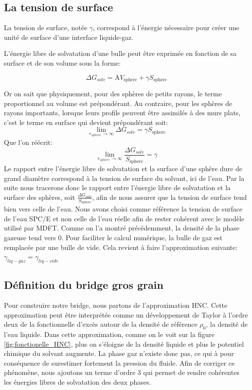 \subsection{La tension de surface}
La tension de surface, notée $\gamma$, correspond à l'énergie nécessaire pour créer une unité de surface d'une interface liquide-gaz.

L'énergie libre de solvatation d'une bulle peut être exprimée en fonction de sa surface et de son volume sous la forme:

\begin{equation} \label{eq:energie_libre_terme_volume_surface}
\Delta G_{solv}= \mathrm{A} V_{\mathrm{sphere}} + \gamma S_{\mathrm{sphere}} 
\end{equation}

\noindent Or on sait que physiquement, pour des sphères de petits rayons, le terme proportionnel au volume est prépondérant.
Au contraire, pour les sphères de rayons importants, lorsque leurs profils peuvent être assimilés à des murs plats, c'est le terme en surface qui devient prépondérant soit:
\begin{equation}
\lim\limits_{r_{sphere} \to \infty} \Delta G_{solv} = \gamma S_{\mathrm{sphere}} 
\end{equation}
Que l'on réécrit:
\begin{equation}
\lim\limits_{r_{sphere} \to \infty} \frac{\Delta G_{solv}}{S_{\mathrm{sphere}}} = \gamma 
\end{equation}
Le rapport entre l'énergie libre de solvatation et la surface d'une sphère dure de grand diamètre correspond à la tension de surface du solvant, ici de l'eau.
Par la suite nous tracerons donc le rapport entre l'énergie libre de solvatation et la surface des sphères, soit $\frac{\Delta G_{solv}}{S_{\mathrm{sphere}}}$, afin de nous assurer que la tension de surface tend bien vers celle de l'eau.
Nous avons choisi comme référence la tension de surface de l'eau SPC/E et non celle de l'eau réelle afin de rester cohérent avec le modèle utilisé par MDFT.
Comme on l'a montré précédemment, la densité de la phase gazeuse tend vers 0. Pour faciliter le calcul numérique, la bulle de gaz est remplacée par une bulle de vide. Cela revient à faire l'approximation suivante: $\gamma_{liq-gaz} = \gamma_{liq-vide}$



\subsection{Définition du bridge gros grain}
Pour construire notre bridge, nous partons de l'approximation HNC. Cette approximation peut être interprétée comme un développement de Taylor à l'ordre deux de la fonctionnelle d'excès autour de la densité de référence $\rho_{0}$, la densité de l'eau liquide.
Dans cette approximation, comme on le voit sur la figure \ref{fig:fonctionelle_HNC}, plus on s'éloigne de la densité liquide et plus le potentiel chimique du solvant augmente. La phase gaz n'existe donc pas, ce qui à pour conséquence de surestimer fortement la pression du fluide.
Afin de corriger ce phénomène, nous ajoutons un terme d'ordre 3 qui permet de rendre cohérentes les énergies libres de solvatation des deux phases.


